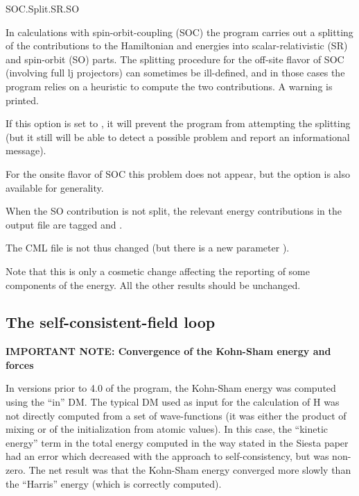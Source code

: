 \begin{fdflogicalT}{SOC.Split.SR.SO}

  In calculations with spin-orbit-coupling (SOC) the program carries
  out a splitting of the contributions to the Hamiltonian and energies
  into scalar-relativistic (SR) and spin-orbit (SO) parts. The
  splitting procedure for the off-site flavor of SOC (involving full
  lj projectors) can sometimes be ill-defined, and in those cases the
  program relies on a heuristic to compute the two contributions. A
  warning is printed.
  
  If this option is set to \fdffalse, it will prevent the program from
  attempting the splitting (but it still will be able to detect a
  possible problem and report an informational message).
  
  For the onsite flavor of SOC this problem does not appear, but the
  option is also available for generality.
  
  When the SO contribution is not split, the relevant energy
  contributions in the output file are tagged 
   and .
  
  The CML file is not thus changed (but there is a new parameter
  ).
  
  Note that this is only a cosmetic change affecting the reporting of
  some components of the energy. All the other results should be
  unchanged.

\end{fdflogicalT}

\subsection{The self-consistent-field loop}

\textbf{IMPORTANT NOTE: Convergence of the Kohn-Sham energy and forces}

In versions prior to 4.0 of the program, the Kohn-Sham energy was computed
using the ``in'' DM. The typical DM used as input for the calculation
of H was not directly computed from a set of wave-functions (it was
either the product of mixing or of the initialization from atomic
values). In this case, the ``kinetic energy'' term in the total energy
computed in the way stated in the Siesta paper had an error which
decreased with the approach to self-consistency, but was non-zero. The
net result was that the Kohn-Sham energy converged more slowly than
the ``Harris'' energy (which is correctly computed).

